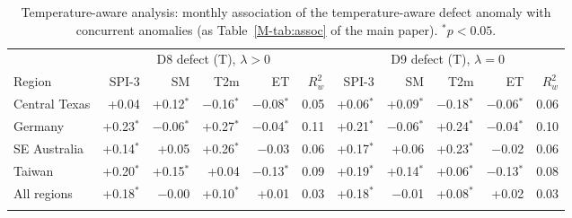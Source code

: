 \begin{table}[tbp]
\caption{Temperature-aware analysis: monthly association of the temperature-aware defect anomaly with
concurrent anomalies (as Table~\ref{M-tab:assoc} of the main paper). $^{\ast}p<0.05$.}
\label{tab:assocmv}
\footnotesize\setlength{\tabcolsep}{4pt}
\begin{tabular*}{\textwidth}{@{\extracolsep\fill}lrrrrrrrrrr}
\toprule
& \multicolumn{5}{c}{D8 defect (T), $\lambda>0$} & \multicolumn{5}{c}{D9 defect (T), $\lambda=0$}\\
\cmidrule{2-6}\cmidrule{7-11}
Region & SPI-3 & SM & T2m & ET & $R^2_w$ & SPI-3 & SM & T2m & ET & $R^2_w$\\
\midrule
Central Texas & +0.04 & +0.12$^{\ast}$ & $-$0.16$^{\ast}$ & $-$0.08$^{\ast}$ & 0.05 & +0.06$^{\ast}$ & +0.09$^{\ast}$ & $-$0.18$^{\ast}$ & $-$0.06$^{\ast}$ & 0.06 \\
Germany & +0.23$^{\ast}$ & $-$0.06$^{\ast}$ & +0.27$^{\ast}$ & $-$0.04$^{\ast}$ & 0.11 & +0.21$^{\ast}$ & $-$0.06$^{\ast}$ & +0.24$^{\ast}$ & $-$0.04$^{\ast}$ & 0.10 \\
SE Australia & +0.14$^{\ast}$ & +0.05 & +0.26$^{\ast}$ & $-$0.03 & 0.06 & +0.17$^{\ast}$ & +0.06 & +0.23$^{\ast}$ & $-$0.02 & 0.06 \\
Taiwan & +0.20$^{\ast}$ & +0.15$^{\ast}$ & +0.04 & $-$0.13$^{\ast}$ & 0.09 & +0.19$^{\ast}$ & +0.14$^{\ast}$ & +0.06$^{\ast}$ & $-$0.13$^{\ast}$ & 0.08 \\
All regions & +0.18$^{\ast}$ & $-$0.00 & +0.10$^{\ast}$ & +0.01 & 0.03 & +0.18$^{\ast}$ & $-$0.01 & +0.08$^{\ast}$ & +0.02 & 0.03 \\
\botrule
\end{tabular*}
\end{table}
